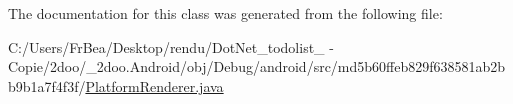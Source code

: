 The documentation for this class was generated from the following file:\begin{CompactItemize}
\item 
C:/Users/FrBea/Desktop/rendu/DotNet\_\-todolist\_ - Copie/2doo/\_\-2doo.Android/obj/Debug/android/src/md5b60ffeb829f638581ab2bb9b1a7f4f3f/\hyperlink{_platform_renderer_8java}{PlatformRenderer.java}\end{CompactItemize}
